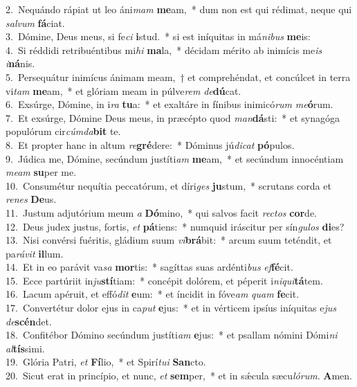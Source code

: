 {2.~}Nequándo rápiat ut leo áni\textit{mam} \textbf{me}am,~* dum non est qui rédimat, neque qui \textit{sal}\textit{vum} \textbf{fá}ciat.\\
{3.~}Dómine, Deus meus, si fe\textit{ci} \textbf{i}stud.~* si est iníquitas in má\textit{ni}\textit{bus} \textbf{me}is:\\
{4.~}Si réddidi retribuéntibus mi\textit{hi} \textbf{ma}la,~* décidam mérito ab inimícis me\textit{is} \textit{i}\textbf{ná}nis.\\
{5.~}Persequátur inimícus ánimam meam,~† et comprehéndat, et concúlcet in terra vi\textit{tam} \textbf{me}am,~* et glóriam meam in púlve\textit{rem} \textit{de}\textbf{dú}cat.\\
{6.~}Exsúrge, Dómine, in i\textit{ra} \textbf{tu}a:~* et exaltáre in fínibus inimicó\textit{rum} \textit{me}\textbf{ó}rum.\\
{7.~}Et exsúrge, Dómine Deus meus, in præcépto quod \textit{man}\textbf{dá}sti:~* et synagóga populórum cir\textit{cúm}\textit{da}\textbf{bit} te.\\
{8.~}Et propter hanc in altum \textit{re}\textbf{gré}dere:~* Dóminus jú\textit{di}\textit{cat} \textbf{pó}pulos.\\
{9.~}Júdica me, Dómine, secúndum justíti\textit{am} \textbf{me}am,~* et secúndum innocéntiam \textit{me}\textit{am} \textbf{su}per me.\\
{10.~}Consumétur nequítia peccatórum, et díri\textit{ges} \textbf{ju}stum,~* scrutans corda et \textit{re}\textit{nes} \textbf{De}us.\\
{11.~}Justum adjutórium meum \textit{a} \textbf{Dó}mino,~* qui salvos facit \textit{re}\textit{ctos} \textbf{cor}de.\\
{12.~}Deus judex justus, fortis, \textit{et} \textbf{pá}tiens:~* numquid iráscitur per sín\textit{gu}\textit{los} \textbf{di}es?\\
{13.~}Nisi convérsi fuéritis, gládium suum \textit{vi}\textbf{brá}bit:~* arcum suum teténdit, et pa\textit{rá}\textit{vit} \textbf{il}lum.\\
{14.~}Et in eo parávit va\textit{sa} \textbf{mor}tis:~* sagíttas suas ardénti\textit{bus} \textit{ef}\textbf{fé}cit.\\
{15.~}Ecce partúriit in\textit{ju}\textbf{stí}tiam:~* concépit dolórem, et péperit i\textit{ni}\textit{qui}\textbf{tá}tem.\\
{16.~}Lacum apéruit, et effó\textit{dit} \textbf{e}um:~* et íncidit in fóve\textit{am} \textit{quam} \textbf{fe}cit.\\
{17.~}Convertétur dolor ejus in ca\textit{put} \textbf{e}jus:~* et in vérticem ipsíus iníquitas e\textit{jus} \textit{de}\textbf{scén}det.\\
{18.~}Confitébor Dómino secúndum justíti\textit{am} \textbf{e}jus:~* et psallam nómini Dómi\textit{ni} \textit{al}\textbf{tís}simi.\\
{19.~}Glória Patri, \textit{et} \textbf{Fí}lio,~* et Spirí\textit{tu}\textit{i} \textbf{San}cto.\\
{20.~}Sicut erat in princípio, et nunc, \textit{et} \textbf{sem}per,~* et in sǽcula sæcu\textit{ló}\textit{rum}. \textbf{A}men.\\
